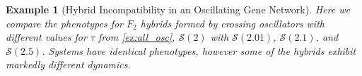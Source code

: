 \documentclass{article}
\newcommand{\1}{\mathbbm{1}}
\newcommand{\Sys}{\mathcal{S}}
\newtheorem{example}{Example}
\begin{document}
  \begin{example}[Hybrid Incompatibility in an Oscillating Gene Network] \label{ex:hybrid_osc}
    Here we compare the phenotypes for $F_2$ hybrids formed by crossing oscillators with different values for $\tau$ from \ref{ex:all_osc}, $\Sys(2)$ with $\Sys(2.01)$, $\Sys(2.1)$, and $\Sys(2.5)$.
    Systems have identical phenotypes, however some of the hybrids exhibit markedly different dynamics. 




\end{example}
\end{document}

